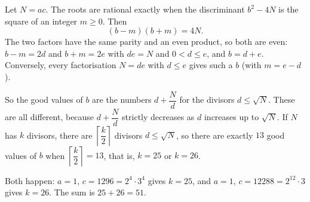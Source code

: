 Let $N=ac$. The roots are rational exactly when the discriminant $b^2-4N$ is the square of an integer $m\ge0$. Then
\[(b-m)(b+m)=4N .\]
The two factors have the same parity and an even product, so both are even: $b-m=2d$ and $b+m=2e$ with $de=N$ and $0<d\le e$, and $b=d+e$. Conversely, every factorisation $N=de$ with $d\le e$ gives such a $b$ (with $m=e-d$).

So the good values of $b$ are the numbers $d+\dfrac {N}{d}$ for the divisors $d\le\sqrt N$. These are all different, because $d+\dfrac {N}{d}$ strictly decreases as $d$ increases up to $\sqrt N$. If $N$ has $k$ divisors, there are $\left\lceil\dfrac {k}{2}\right\rceil$ divisors $d\le\sqrt N$, so there are exactly $13$ good values of $b$ when $\left\lceil\dfrac {k}{2}\right\rceil=13$, that is, $k=25$ or $k=26$.

Both happen: $a=1$, $c=1296=2^4\cdot3^4$ gives $k=25$, and $a=1$, $c=12288=2^{12}\cdot3$ gives $k=26$. The sum is $25+26=\boxed{51}$.
